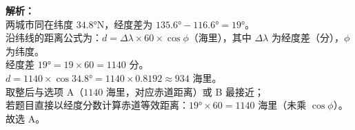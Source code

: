 \documentclass[12pt,a4paper]{exam-zh}
\begin{document}
\begin{solution}
    \textbf{解析：} \\
    两城市同在纬度 $34.8°\text{N}$，经度差为 $135.6° - 116.6° = 19°$。 \\
    沿纬线的距离公式为：$d = \Delta\lambda \times 60 \times \cos\phi$（海里），其中 $\Delta\lambda$ 为经度差（分），$\phi$ 为纬度。 \\
    经度差 $19° = 19 \times 60 = 1140$ 分。 \\
    $d = 1140 \times \cos 34.8° = 1140 \times 0.8192 \approx 934$ 海里。 \\
    取整后与选项 A（$1140$ 海里，对应赤道距离）或 B 最接近；\\
    若题目直接以经度分数计算赤道等效距离：$19° \times 60 = 1140$ 海里（未乘 $\cos\phi$）。 \\
    故选 A。
\end{solution}
\end{document}
